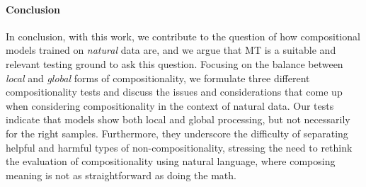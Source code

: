 \paragraph{Conclusion}
In conclusion, with this work, we contribute to the question of how compositional models trained on \emph{natural} data are, and we argue that MT is a suitable and relevant testing ground to ask this question.
Focusing on the balance between \emph{local} and \emph{global} forms of compositionality, we formulate three different compositionality tests and discuss the issues and considerations that come up when considering compositionality in the context of natural data.
Our tests indicate that models show both local and global processing, but not necessarily for the right samples.
Furthermore, they underscore the difficulty of separating helpful and harmful types of non-compositionality, stressing the need to rethink the evaluation of compositionality using natural language, where composing meaning is not as straightforward as doing the math.
